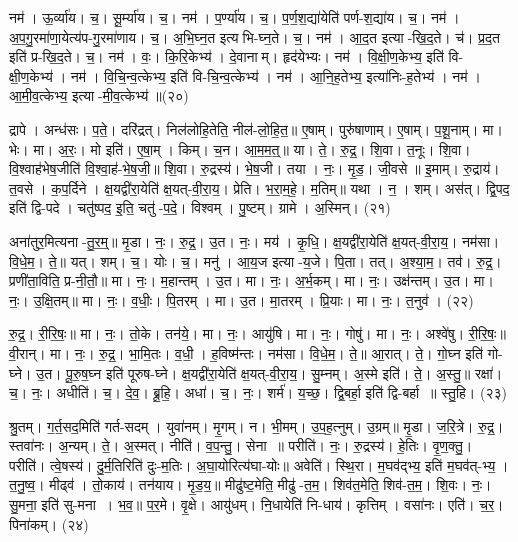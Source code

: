 नम॑। ऊ॒र्व्या॑य। च॒। सू॒र्म्या॑य। च॒। 
नम॑। प॒र्ण्या॑य। च॒। प॒र्ण॒श॒द्या॑येति॑ पर्ण-श॒द्या॑य। च॒। 
नम॑। अ॒प॒गु॒रमा॑णा॒येत्य॑प-गु॒रमा॑णाय। च॒। अ॒भि॒घ्न॒त इत्यभि-घ्न॒ते। च॒। 
नम॑। आ॒\akhkhi{}द॒त इत्या-खि॒द॒ते। च॑। प्र॒\akhkhi{}द॒त इति॑ प्र-खि॒द॒ते। च॒। 
नम॑। वः॒। कि॒रि॒केभ्य॑। दे॒वानाम्। हृद॑येभ्यः। नम॑। 
वि॒क्षी॒ण॒केभ्य॒ इति॑ वि-क्षी॒ण॒केभ्य॑। नम॑। वि॒चि॒न्व॒त्केभ्य॒ इति॑ वि-चि॒न्व॒त्केभ्य॑। नम॑। 
आ॒नि॒\ar{}ह॒तेभ्य॒ इत्या॑निः-ह॒तेभ्य॑। नम॑। आ॒मी॒व॒त्केभ्य॒ इत्या-मी॒व॒त्केभ्य॑॥(२०)


द्रापे। अन्ध॑सः। प॒ते॒। दरि॑द्रत्। निल॑लोहि॒तेति॒ नील॑-लो॒हि॒त॒॥ 
ए॒षाम्। पुरु॑षाणाम्। ए॒षाम्। प॒शू॒नाम्। मा। भेः। मा। अ॒रः॒। मो इति॑। ए॒षा॒म्। किम्। च॒न। आ॒म॒म॒त्॒॥ 
या। ते॒। रु॒द्र॒। शि॒वा। त॒नूः। शि॒वा। वि॒श्वाह॑भेष॒जीति॑ वि॒श्वा॒ह॑-भे॒ष॒जी॒॥ 
शि॒वा। रु॒द्रस्य॑। भे॒ष॒जी। तया। नः॒। मृ॒ड॒। जी॒वसे॥ 
इ॒माम्। रु॒द्राय॑। त॒वसे। क॒प॒र्दिने। क्ष॒यद्वी॑रा॒येति॑ क्ष॒यत्-वी॒रा॒य॒। प्रेति। भ॒रा॒म॒हे॒। म॒तिम्॥ 
यथा। न॒। शम्। अस॑त्। द्वि॒पद॒ इति॑ द्वि-पदे। चतु॑ष्पद॒ इ॒ति॒ चतु॑-प॒दे॒। विश्वम्। पु॒ष्टम्। ग्रामे। अ॒स्मिन्। (२१)


अना॑तुर॒मित्यना-तु॒र॒म्॒॥ 
मृ॒डा। नः॒। रु॒द्र॒। उ॒त। नः॒। मय॑। कृ॒धि॒। क्ष॒यद्वी॑रा॒येति॑ क्ष॒यत्-वी॒रा॒य॒। नम॑सा। वि॒धे॒म॒। ते॒॥ 
यत्। शम्। च॒। योः। च॒। मनु॑। आ॒य॒ज इत्या-य॒जे। पि॒ता। तत्। अ॒श्या॒म॒। तव॑। रु॒द्र॒। प्रणी॑ता॒विति॒ प्र-नी॒तौ॒॥ 
मा। नः॒। म॒हान्तम्। उ॒त। मा। नः॒। अ॒र्भ॒कम्। मा। नः॒। उक्ष॑न्तम्। उ॒त। मा। नः॒। उ॒क्षि॒तम्॥ 
मा। नः॒। व॒धीः॒। पि॒तरम्। मा। उ॒त। मा॒तरम्। प्रि॒याः। मा। नः॒। त॒नुव॑। (२२)


रु॒द्र॒। री॒रि॒षः॒॥ 
मा। नः॒। तो॒के। तन॑ये॒। मा। नः॒। आयु॑षि। मा। नः॒। गोषु॑। मा। नः॒। अश्वे॑षु। री॒रि॒षः॒॥ 
वी॒रान्। मा। नः॒। रु॒द्र॒। भा॒मि॒तः। व॒धी॒। ह॒विष्म॑न्तः। नम॑सा। वि॒धे॒म॒। ते॒॥ 
आ॒रात्। ते॒। गो॒घ्न इति॑ गो-घ्ने। उ॒त। पू॒रु॒ष॒घ्न इति॑ पूरुष-घ्ने। क्ष॒यद्वी॑रा॒येति॑ क्ष॒यत्-वी॒रा॒य॒। सु॒म्नम्। अ॒स्मे इति॑। ते॒। अ॒स्तु॒॥ 
रक्षा॑। च॒। नः॒। अधीति॑। च॒। दे॒व॒। ब्रू॒हि॒। अधा॑। च॒। नः॒। शर्म॑। य॒च्छ॒। द्वि॒बर्हा॒ इति॑ द्वि-बर्हा॥ 
स्तु॒हि। (२३)


श्रु॒तम्। ग॒र्त॒सद॒मिति॑ गर्त-सदम्। युवा॑नम्। मृ॒गम्। न। भी॒मम्। उ॒प॒ह॒त्नुम्। उ॒ग्रम्॥ 
मृ॒डा। ज॒रि॒त्रे। रु॒द्र॒। स्तवा॑नः। अ॒न्यम्। ते॒। अ॒स्मत्। नीति॑। व॒प॒न्तु॒। सेना॥ 
परीति॑। नः॒। रु॒द्रस्य॑। हे॒तिः। वृ॒ण॒क्तु॒। परीति॑। त्वे॒षस्य॑। दु॒र्म॒तिरिति॑ दुः-म॒तिः। अ॒घा॒योरित्य॑घा-योः॥ 
अवेति॑। स्थि॒रा। म॒घव॑द्भ्य॒ इति॑ म॒घव॑त्-भ्य॒। त॒नु॒ष्व॒। मीढ्व॑। तो॒काय॑। तन॑याय। मृ॒ड॒य॒॥ 
मीढु॑ष्ट॒मेति॒ मीढु॑-त॒म॒। शिव॑त॒मेति॒ शिव॑-त॒म॒। शि॒वः। नः॒। सु॒मना॒ इति॑ सु-मना। भ॒व॒॥ 
प॒र॒मे। वृ॒क्षे। आयु॑धम्। नि॒धायेति॑ नि-धाय॑। कृत्तिम्। वसा॑नः। एति॑। च॒र॒। पिना॑कम्। (२४)


